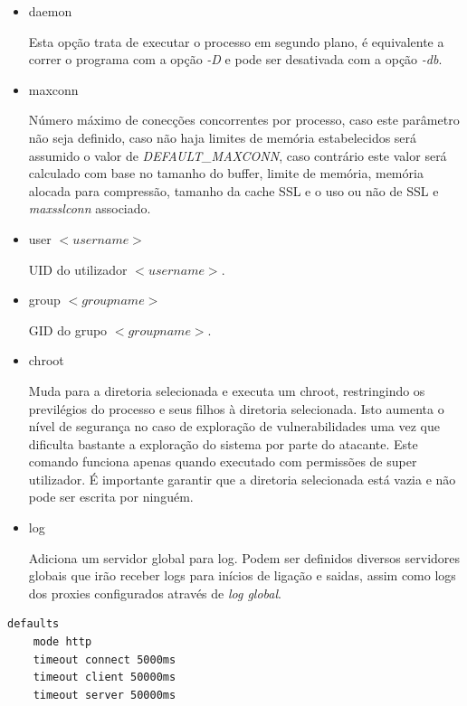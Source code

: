 \documentclass[12pt,a4paper]{article}
\begin{document}
\begin{itemize}
    \item daemon

Esta opção trata de executar o processo em segundo plano, é equivalente a correr o programa com a opção \emph{-D} e pode ser desativada com a opção \emph{-db}.

    \item maxconn
    
Número máximo de conecções concorrentes por processo, caso este parâmetro não seja definido, caso não haja limites de memória estabelecidos será assumido o valor de \emph{DEFAULT\_MAXCONN}, caso contrário este valor será calculado com base no tamanho do buffer, limite de memória, memória alocada para compressão, tamanho da cache SSL e o uso ou não de SSL e \emph{maxsslconn} associado.

    \item user $<username>$
    
UID do utilizador $<username>$.

    \item group $<groupname>$
    
GID do grupo $<groupname>$.

    \item chroot
    
Muda para a diretoria selecionada e executa um chroot, restringindo os previlégios do processo e seus filhos à diretoria selecionada. Isto aumenta o nível de segurança no caso de exploração de vulnerabilidades uma vez que dificulta bastante a exploração do sistema por parte do atacante. Este comando funciona apenas quando executado com permissões de super utilizador. É importante garantir que a diretoria selecionada está vazia e não pode ser escrita por ninguém.

    \item log
    
Adiciona um servidor global para log. Podem ser definidos diversos servidores globais que irão receber logs para inícios de ligação e saidas, assim como logs dos proxies configurados através de \emph{log global}.

\end{itemize}



\begin{verbatim}
defaults  
    mode http
    timeout connect 5000ms
    timeout client 50000ms
    timeout server 50000ms

\end{verbatim}
\end{document}

